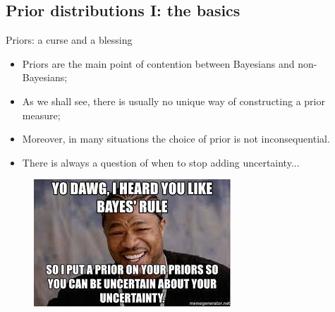 \subsection{Prior distributions I: the basics}
\begin{frame}{Priors: a curse and a blessing}
\begin{itemize}
 \item Priors are the main point of contention between Bayesians and non-Bayesians;
 \item As we shall see, there is usually no unique way of constructing a prior measure;
 \item Moreover, in many situations the choice of prior is not inconsequential.
 \item There is always a question of when to stop adding uncertainty...
\end{itemize}
\begin{figure}
 \includegraphics[scale=0.6]{figures/turtles_all_the_way_down.jpeg}
\end{figure}
\end{frame}
